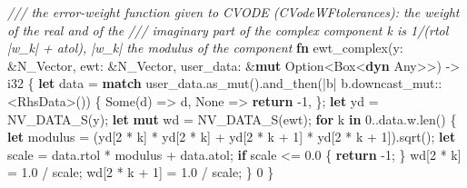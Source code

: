 \documentclass[
  10pt,
]{article}
\newenvironment{Shaded}{}{}
\newcommand{\BuiltInTok}[1]{\textcolor[rgb]{0.00,0.50,0.00}{#1}}
\newcommand{\CommentTok}[1]{\textcolor[rgb]{0.38,0.63,0.69}{\textit{#1}}}
\newcommand{\ConstantTok}[1]{\textcolor[rgb]{0.53,0.00,0.00}{#1}}
\newcommand{\ControlFlowTok}[1]{\textcolor[rgb]{0.00,0.44,0.13}{\textbf{#1}}}
\newcommand{\DataTypeTok}[1]{\textcolor[rgb]{0.56,0.13,0.00}{#1}}
\newcommand{\DecValTok}[1]{\textcolor[rgb]{0.25,0.63,0.44}{#1}}
\newcommand{\KeywordTok}[1]{\textcolor[rgb]{0.00,0.44,0.13}{\textbf{#1}}}
\newcommand{\NormalTok}[1]{#1}
\newcommand{\OperatorTok}[1]{\textcolor[rgb]{0.40,0.40,0.40}{#1}}
\newcommand{\PreprocessorTok}[1]{\textcolor[rgb]{0.74,0.48,0.00}{#1}}
\begin{document}
\begin{Shaded}
\begin{Highlighting}[]
\CommentTok{/// the error{-}weight function given to CVODE (CVodeWFtolerances): the weight of the real and of the}
\CommentTok{/// imaginary part of the complex component k is 1/(rtol |w\_k| + atol), |w\_k| the modulus of the component}
\KeywordTok{fn}\NormalTok{ ewt\_complex(y}\OperatorTok{:} \OperatorTok{\&}\NormalTok{N\_Vector}\OperatorTok{,}\NormalTok{ ewt}\OperatorTok{:} \OperatorTok{\&}\NormalTok{N\_Vector}\OperatorTok{,}\NormalTok{ user\_data}\OperatorTok{:} \OperatorTok{\&}\KeywordTok{mut} \DataTypeTok{Option}\OperatorTok{\textless{}}\DataTypeTok{Box}\OperatorTok{\textless{}}\KeywordTok{dyn} \BuiltInTok{Any}\OperatorTok{\textgreater{}\textgreater{}}\NormalTok{) }\OperatorTok{{-}\textgreater{}} \DataTypeTok{i32} \OperatorTok{\{}
    \KeywordTok{let}\NormalTok{ data }\OperatorTok{=} \ControlFlowTok{match}\NormalTok{ user\_data}\OperatorTok{.}\NormalTok{as\_mut()}\OperatorTok{.}\NormalTok{and\_then(}\OperatorTok{|}\NormalTok{b}\OperatorTok{|}\NormalTok{ b}\OperatorTok{.}\PreprocessorTok{downcast\_mut::}\OperatorTok{\textless{}}\NormalTok{RhsData}\OperatorTok{\textgreater{}}\NormalTok{()) }\OperatorTok{\{}
        \ConstantTok{Some}\NormalTok{(d) }\OperatorTok{=\textgreater{}}\NormalTok{ d}\OperatorTok{,}
        \ConstantTok{None} \OperatorTok{=\textgreater{}} \ControlFlowTok{return} \OperatorTok{{-}}\DecValTok{1}\OperatorTok{,}
    \OperatorTok{\};}
    \KeywordTok{let}\NormalTok{ yd }\OperatorTok{=}\NormalTok{ NV\_DATA\_S(y)}\OperatorTok{;}
    \KeywordTok{let} \KeywordTok{mut}\NormalTok{ wd }\OperatorTok{=}\NormalTok{ NV\_DATA\_S(ewt)}\OperatorTok{;}
    \ControlFlowTok{for}\NormalTok{ k }\KeywordTok{in} \DecValTok{0}\OperatorTok{..}\NormalTok{data}\OperatorTok{.}\NormalTok{w}\OperatorTok{.}\NormalTok{len() }\OperatorTok{\{}
        \KeywordTok{let}\NormalTok{ modulus }\OperatorTok{=}\NormalTok{ (yd[}\DecValTok{2} \OperatorTok{*}\NormalTok{ k] }\OperatorTok{*}\NormalTok{ yd[}\DecValTok{2} \OperatorTok{*}\NormalTok{ k] }\OperatorTok{+}\NormalTok{ yd[}\DecValTok{2} \OperatorTok{*}\NormalTok{ k }\OperatorTok{+} \DecValTok{1}\NormalTok{] }\OperatorTok{*}\NormalTok{ yd[}\DecValTok{2} \OperatorTok{*}\NormalTok{ k }\OperatorTok{+} \DecValTok{1}\NormalTok{])}\OperatorTok{.}\NormalTok{sqrt()}\OperatorTok{;}
        \KeywordTok{let}\NormalTok{ scale }\OperatorTok{=}\NormalTok{ data}\OperatorTok{.}\NormalTok{rtol }\OperatorTok{*}\NormalTok{ modulus }\OperatorTok{+}\NormalTok{ data}\OperatorTok{.}\NormalTok{atol}\OperatorTok{;}
        \ControlFlowTok{if}\NormalTok{ scale }\OperatorTok{\textless{}=} \DecValTok{0.0} \OperatorTok{\{}
            \ControlFlowTok{return} \OperatorTok{{-}}\DecValTok{1}\OperatorTok{;}
        \OperatorTok{\}}
\NormalTok{        wd[}\DecValTok{2} \OperatorTok{*}\NormalTok{ k] }\OperatorTok{=} \DecValTok{1.0} \OperatorTok{/}\NormalTok{ scale}\OperatorTok{;}
\NormalTok{        wd[}\DecValTok{2} \OperatorTok{*}\NormalTok{ k }\OperatorTok{+} \DecValTok{1}\NormalTok{] }\OperatorTok{=} \DecValTok{1.0} \OperatorTok{/}\NormalTok{ scale}\OperatorTok{;}
    \OperatorTok{\}}
    \DecValTok{0}
\OperatorTok{\}}


\end{Highlighting}
\end{Shaded}
\end{document}
